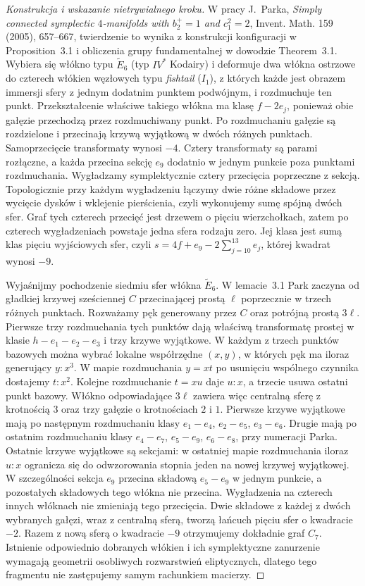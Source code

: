 \begin{proof}[Konstrukcja i wskazanie nietrywialnego kroku]
W pracy J.~Parka, \emph{Simply connected symplectic
$4$-manifolds with $b_2^+=1$ and $c_1^2=2$},
Invent. Math. 159 (2005), 657--667, twierdzenie to
wynika z konstrukcji konfiguracji w Proposition~3.1 i
obliczenia grupy fundamentalnej w dowodzie Theorem~3.1.
Wybiera się włókno typu $\widetilde E_6$ (typ $IV^*$
Kodairy) i deformuje dwa włókna ostrzowe do czterech
włókien węzłowych typu \emph{fishtail} ($I_1$),
z których każde jest obrazem immersji sfery
z jednym dodatnim punktem podwójnym, i rozdmuchuje ten punkt. Przekształcenie
właściwe takiego włókna ma klasę $f-2e_j$,
ponieważ obie gałęzie przechodzą przez rozdmuchiwany
punkt. Po rozdmuchaniu gałęzie są rozdzielone
i przecinają krzywą wyjątkową w dwóch różnych
punktach. Samoprzecięcie transformaty wynosi $-4$.
Cztery transformaty są parami rozłączne, a każda
przecina sekcję $e_9$ dodatnio w jednym punkcie
poza punktami rozdmuchania. Wygładzamy symplektycznie
cztery przecięcia poprzeczne z sekcją.
Topologicznie przy każdym wygładzeniu łączymy
dwie różne składowe przez wycięcie dysków
i wklejenie pierścienia, czyli wykonujemy sumę
spójną dwóch sfer. Graf tych czterech przecięć
jest drzewem o pięciu wierzchołkach, zatem
po czterech wygładzeniach powstaje jedna
sfera rodzaju zero. Jej klasa jest sumą
klas pięciu wyjściowych sfer, czyli
$s=4f+e_9-2\sum_{j=10}^{13}e_j$, której kwadrat
wynosi $-9$.

Wyjaśnijmy pochodzenie siedmiu sfer włókna
$\widetilde E_6$. W lemacie~3.1 Park zaczyna
od gładkiej krzywej sześciennej $C$ przecinającej
prostą $\ell$ poprzecznie w trzech różnych punktach.
Rozważamy pęk generowany przez $C$ oraz
potrójną prostą $3\ell$.
Pierwsze trzy rozdmuchania tych punktów
dają właściwą transformatę prostej w klasie
$h-e_1-e_2-e_3$ i trzy krzywe wyjątkowe.
W każdym z trzech punktów bazowych można
wybrać lokalne współrzędne $(x,y)$, w których
pęk ma iloraz generujący $y:x^3$.
W mapie rozdmuchania $y=xt$ po usunięciu
wspólnego czynnika dostajemy $t:x^2$.
Kolejne rozdmuchanie $t=xu$ daje $u:x$,
a trzecie usuwa ostatni punkt bazowy.
Włókno odpowiadające $3\ell$ zawiera więc
centralną sferę z krotnością $3$ oraz trzy
gałęzie o krotnościach $2$ i $1$.
Pierwsze krzywe wyjątkowe mają po następnym
rozdmuchaniu klasy $e_1-e_4$, $e_2-e_5$,
$e_3-e_6$. Drugie mają po ostatnim rozdmuchaniu
klasy $e_4-e_7$, $e_5-e_9$, $e_6-e_8$,
przy numeracji Parka.
Ostatnie krzywe wyjątkowe są sekcjami:
w ostatniej mapie rozdmuchania iloraz $u:x$
ogranicza się do odwzorowania stopnia jeden
na nowej krzywej wyjątkowej.
W szczególności sekcja $e_9$ przecina
składową $e_5-e_9$ w jednym punkcie,
a pozostałych składowych tego włókna nie przecina.
Wygładzenia na czterech innych włóknach nie
zmieniają tego przecięcia. Dwie składowe
z każdej z dwóch wybranych gałęzi, wraz z centralną
sferą, tworzą łańcuch pięciu sfer o kwadracie $-2$.
Razem z nową sferą o kwadracie $-9$
otrzymujemy dokładnie graf $C_7$. Istnienie
odpowiednio dobranych włókien i ich symplektyczne
zanurzenie wymagają geometrii osobliwych rozwarstwień
eliptycznych, dlatego tego fragmentu nie zastępujemy
samym rachunkiem macierzy.


\end{proof}
